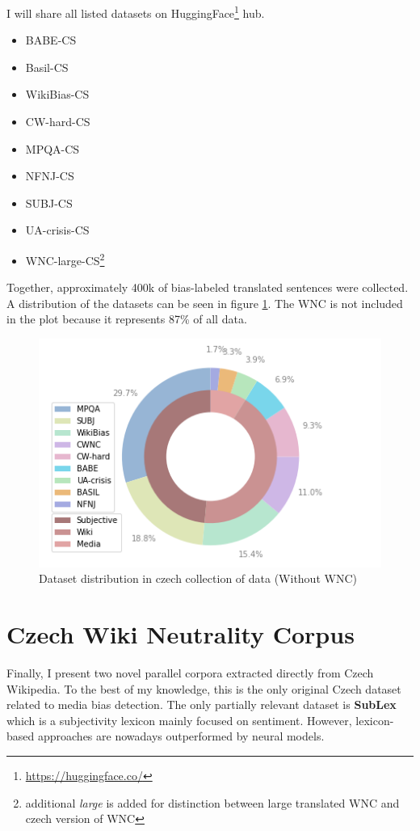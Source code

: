 I will share all listed datasets on HuggingFace\footnote{\url{https://huggingface.co/}} hub.

\begin{itemize}
    \item BABE-CS
    \item Basil-CS
    \item WikiBias-CS
    \item CW-hard-CS
    \item MPQA-CS
    \item NFNJ-CS
    \item SUBJ-CS
    \item UA-crisis-CS
    \item WNC-large-CS\footnote{additional \textit{large} is added for distinction between large translated WNC and czech version of WNC}
\end{itemize}

Together, approximately 400k of bias-labeled translated sentences were collected. A distribution of the datasets can be seen in figure \ref{fig:cz_data}. The WNC is not included in the plot because it represents 87\% of all data. 


\begin{figure}
  \includegraphics[scale=0.5]{my_modules/multimedia/withoutWNC.png}
  \caption{Dataset distribution in czech collection of data (Without WNC)}
  \label{fig:cz_data}
\end{figure}




\section{Czech Wiki Neutrality Corpus}
Finally, I present two novel parallel corpora extracted directly from Czech Wikipedia. To the best of my knowledge, this is the only original Czech dataset related to media bias detection. The only partially relevant dataset is \textbf{SubLex}\cite{11858/00-097C-0000-0022-FF60-B} which is a subjectivity lexicon mainly focused on sentiment. However, lexicon-based approaches are nowadays outperformed by neural models.

